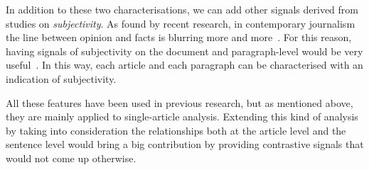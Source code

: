 In addition to these two characterisations, we can add other signals derived from studies on \emph{subjectivity}.
As found by recent research, in contemporary journalism the line between opinion and facts is blurring more and more~\cite{blake2019news}. For this reason, having signals of subjectivity on the document and paragraph-level would be very useful~\cite{liu2010sentiment}.
In this way, each article and each paragraph can be characterised with an indication of subjectivity.




All these features have been used in previous research, but as mentioned above, they are mainly applied to single-article analysis. Extending this kind of analysis by taking into consideration the relationships both at the article level and the sentence level would bring a big contribution by providing contrastive signals that would not come up otherwise. 
